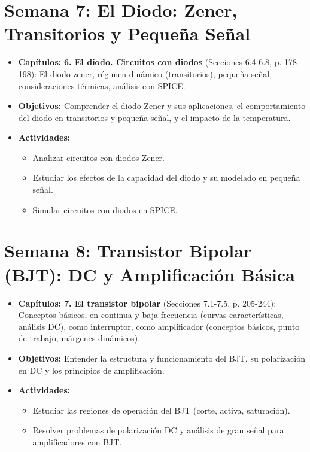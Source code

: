 \documentclass[12pt,a4paper]{article}
\begin{document}
\section{Semana 7: El Diodo: Zener, Transitorios y Pequeña Señal}
\begin{itemize}
    \item \textbf{Capítulos:} \textbf{6. El diodo. Circuitos con diodos} (Secciones 6.4-6.8, p. 178-198): El diodo zener, régimen dinámico (transitorios), pequeña señal, consideraciones térmicas, análisis con SPICE.
    \item \textbf{Objetivos:} Comprender el diodo Zener y sus aplicaciones, el comportamiento del diodo en transitorios y pequeña señal, y el impacto de la temperatura.
    \item \textbf{Actividades:}
    \begin{itemize}
        \item Analizar circuitos con diodos Zener.
        \item Estudiar los efectos de la capacidad del diodo y su modelado en pequeña señal.
        \item Simular circuitos con diodos en SPICE.
    \end{itemize}
\end{itemize}

\section{Semana 8: Transistor Bipolar (BJT): DC y Amplificación Básica}
\begin{itemize}
    \item \textbf{Capítulos:} \textbf{7. El transistor bipolar} (Secciones 7.1-7.5, p. 205-244): Conceptos básicos, en continua y baja frecuencia (curvas características, análisis DC), como interruptor, como amplificador (conceptos básicos, punto de trabajo, márgenes dinámicos).
    \item \textbf{Objetivos:} Entender la estructura y funcionamiento del BJT, su polarización en DC y los principios de amplificación.
    \item \textbf{Actividades:}
    \begin{itemize}
        \item Estudiar las regiones de operación del BJT (corte, activa, saturación).
        \item Resolver problemas de polarización DC y análisis de gran señal para amplificadores con BJT.
    \end{itemize}
\end{itemize}
\end{document}

